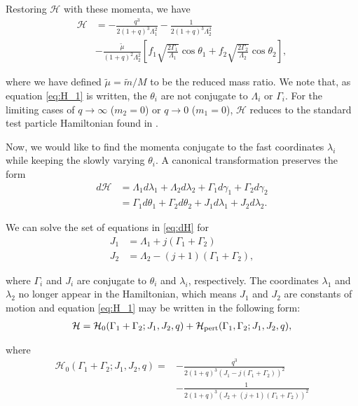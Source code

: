 \documentclass[usenatbib]{mnras}
\begin{document}
\noindent
Restoring \(\mathcal{H}\) with these momenta, we have
\begin{align}
\label{eq:H_1}
  \mathcal{H}
  &= -\frac{q^3}{2(1+q)^3 \Lambda_1^2}
    - \frac{1}{2(1+q)^3\Lambda_2^2} \nonumber\\
  & - \frac{\tilde\mu}{(1+q)^2 \Lambda_2^2}\left[
    f_1\sqrt{\frac{2\Gamma_1}{\Lambda_1}}\cos\theta_1
    +f_2\sqrt{\frac{2\Gamma_2}{\Lambda_2}}\cos\theta_2
    \right],
\end{align}

\noindent where we have defined \(\tilde\mu=\tilde m/M\) to be
the reduced mass ratio.  We note that, as equation \eqref{eq:H_1} is
written, the \(\theta_i\) are not conjugate to \(\Lambda_i\) or
\(\Gamma_i\).  For the limiting cases of \(q\to \infty\) (\(m_2=0\)) or
\(q\to 0\) (\(m_1=0\)), \(\mathcal{H}\) reduces to the standard test
particle Hamiltonian found in \citet{murray_solar_2000}.

Now, we would like to find the momenta conjugate to the fast
coordinates \(\lambda_i\) while keeping the slowly varying \(\theta_i\).
A canonical transformation preserves the form
\begin{align}
  \label{eq:dH} 
  d\mathcal{H}
  &= \Lambda_1 d\lambda_1+\Lambda_2d\lambda_2
    + \Gamma_1d\gamma_1+\Gamma_2d\gamma_2\nonumber\\
  &= \Gamma_1 d\theta_1 + \Gamma_2 d\theta_2
    +J_1 d\lambda_1+J_2d\lambda_2 .
\end{align}

\noindent
We can solve the set of equations in \eqref{eq:dH} for
\begin{align}
\label{eq:J1}
J_1 &= \Lambda_1 + j(\Gamma_1+\Gamma_2)\\
\label{eq:J2}
J_2 &= \Lambda_2 - (j+1)(\Gamma_1+\Gamma_2),
\end{align}

\noindent where \(\Gamma_i\) and \(J_i\) are conjugate to
\(\theta_i\) and \(\lambda_i\), respectively.
The coordinates \(\lambda_1\) and \(\lambda_2\)
no longer appear in the Hamiltonian,
which means \(J_1\) and \(J_2\) are constants of motion and
equation \eqref{eq:H_1} may be written
in the following form:
\begin{align}
\label{eq:H_2}
  \mathcal{H}
  = \mathcal{H}_0(\Gamma_1+\Gamma_2; J_1, J_2, q)
                  + \mathcal{H}_{\rm pert}(\Gamma_1,\Gamma_2; J_1, J_2, q),
\end{align}

\noindent
where
\begin{align}
  \label{eq:H01}
  \mathcal{H}_0(\Gamma_1+\Gamma_2; J_1, J_2, q)
  =& -\frac{q^3}{2(1+q)^3(J_1-j(\Gamma_1+\Gamma_2))^2}\nonumber\\
  &-\frac{1}{2(1+q)^3(J_2+(j+1)(\Gamma_1+\Gamma_2))^2} 
\end{align}
\end{document}
